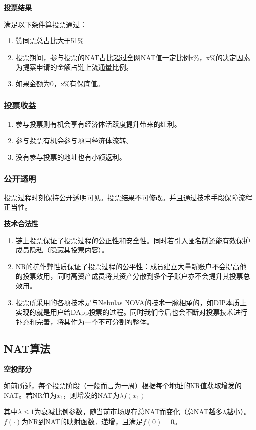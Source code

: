 \textbf{投票结果}

满足以下条件算投票通过：

\begin{enumerate}
\item 赞同票总占比大于51\%
\item 投票期间，参与投票的NAT占比超过全网NAT值一定比例x\%，x\%的决定因素为提案申请的金额占链上流通量比例。
\item 如果金额为0，x\%有保底值。
\end{enumerate}

\subsubsection{投票收益}
\begin{enumerate}
	\item 参与投票则有机会享有经济体活跃度提升带来的红利。
	\item 参与投票有机会参与项目经济体流转。
	\item 没有参与投票的地址也有小额返利。
\end{enumerate}

\subsubsection{公开透明}
投票过程时刻保持公开透明可见。投票结果不可修改。并且通过技术手段保障流程正当性。

\textbf{技术合法性}
\begin{enumerate}
\item 链上投票保证了投票过程的公正性和安全性。同时若引入匿名制还能有效保护成员隐私（隐藏其投票内容）。
\item NR的抗作弊性质保证了投票过程的公平性：成员建立大量新账户不会提高他的投票效用，同时高资产成员将其资产分散到多个子账户亦不会提升其投票总效用。
\item 投票所采用的各项技术是与Nebulas NOVA的技术一脉相承的，如DIP本质上实现的就是用户给DApp投票的过程。同时我们今后也会不断对投票技术进行补充和完善，将其作为一个不可分割的整体。
\end{enumerate}

\subsection{NAT算法}
\textbf{空投部分}

如前所述，每个投票阶段（一般而言为一周）根据每个地址的NR值获取增发的NAT。若NR值为$x_1$，则增发的NAT为$\lambda f(x_1)$

其中$\lambda \leq 1$为衰减比例参数，随当前市场现存总NAT而变化（总NAT越多$\lambda$越小）。$f(\cdot)$为NR到NAT的映射函数，递增，且满足$f(0)=0$。

